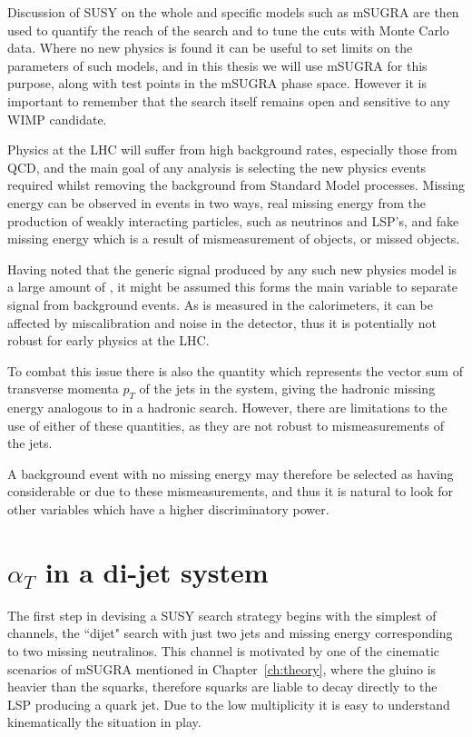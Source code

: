 Discussion of SUSY on the whole and specific models such as mSUGRA are then used to quantify the reach of the search and to tune the cuts with Monte Carlo data. Where no new physics is found it can be useful to set limits on the parameters of such models, and in this thesis we will use mSUGRA for this purpose, along with test points in the mSUGRA phase space. However it is important to remember that the search itself remains open and sensitive to any WIMP candidate. 

Physics at the LHC will suffer from high background rates, especially those from QCD, and the main goal of any analysis is selecting the new physics events required whilst removing the background from Standard Model processes. Missing energy can be observed in events in two ways, real missing energy from the production of weakly interacting particles, such as neutrinos and LSP's, and fake missing energy which is a result of mismeasurement of objects, or missed objects. 

Having noted that the generic signal produced by any such new physics model is a large amount of \met, it might be assumed this forms the main variable to separate signal from background events. As \met is measured in the calorimeters, it can be affected by miscalibration and noise in the detector, thus it is potentially not robust for early physics at the LHC. 

To combat this issue there is also the quantity \mht which represents the vector sum of transverse momenta $p_{T}$ of the jets in the system, giving the hadronic missing energy analogous to \met in a hadronic search. However, there are limitations to the use of either of these quantities, as they are not robust to mismeasurements of the jets. 

A background event with no missing energy may therefore be selected as having considerable \met or \mht due to these mismeasurements, and thus it is natural to look for other variables which have a higher discriminatory power. 


\section{$\alpha_{T}$ in a di-jet system}

The first step in devising a SUSY search strategy begins with the simplest of channels, the ``dijet" search with just two jets and missing energy corresponding to two missing neutralinos.  This channel is motivated by one of the cinematic scenarios of mSUGRA mentioned in Chapter~\ref{ch:theory}, where the gluino is heavier than the squarks, therefore squarks are liable to decay directly to the LSP producing a quark jet. Due to the low multiplicity it is easy to understand kinematically the situation in play. 

